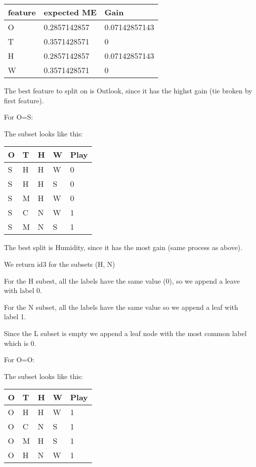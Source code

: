 \documentclass[12pt, fullpage,letterpaper]{article}
\begin{document}
\begin{enumerate}
\begin{enumerate}
	\begin{tabular}{|l|l|l|}
		\hline
		feature & expected ME  & Gain          \\ \hline
		O       & 0.2857142857 & 0.07142857143 \\ \hline
		T       & 0.3571428571 & 0             \\ \hline
		H       & 0.2857142857 & 0.07142857143 \\ \hline
		W       & 0.3571428571 & 0			   \\ \hline
		\end{tabular}


		The best feature to split on is Outlook, since it has the highst gain (tie broken by first feature). 

		For O=S:
		
		The subset looks like this:
		
		\begin{tabular}{|l|l|l|l|l|}
			\hline
			O & T & H & W & Play \\ \hline
			S & H & H & W & 0    \\ \hline
			S & H & H & S & 0    \\ \hline
			S & M & H & W & 0    \\ \hline
			S & C & N & W & 1    \\ \hline
			S & M & N & S & 1    \\ \hline
			\end{tabular}
		
		The best split is Humidity, since it has the most gain (same process as above).
		
		We return id3 for the subsets (H, N)
		
		For the H subest, all the labels have the same value (0), so we append a leave with label 0.
		
		For the N subset, all the labels have the same value so we append a leaf with label 1.
		
		Since the L subset is empty  we append a leaf node with the most common label which is 0. 
		
		For O=O:
		
		The subset looks like this:
		
		\begin{tabular}{|l|l|l|l|l|}
			\hline
			O & T & H & W & Play \\ \hline
			O & H & H & W & 1    \\ \hline
			O & C & N & S & 1    \\ \hline
			O & M & H & S & 1    \\ \hline
			O & H & N & W & 1    \\ \hline
			\end{tabular}
		

\end{enumerate}
\end{enumerate}
\end{document}
